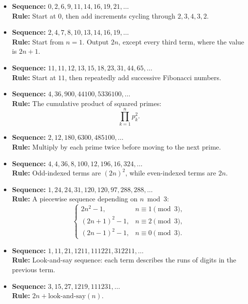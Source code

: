 \documentclass{article}
\theoremstyle{plain}
\theoremstyle{definition}
\theoremstyle{remark}
\begin{document}
\begin{itemize}
    \item \textbf{Sequence:} \(0, 2, 6, 9, 11, 14, 16, 19, 21, \dots\) \\
    \textbf{Rule:} Start at \(0\), then add increments cycling through \(2,3,4,3,2\).

    \item \textbf{Sequence:} \(2, 4, 7, 8, 10, 13, 14, 16, 19, \dots\) \\
    \textbf{Rule:} Start from \(n=1\). Output \(2n\), except every third term, where the value is \(2n+1\).

    \item \textbf{Sequence:} \(11, 11, 12, 13, 15, 18, 23, 31, 44, 65, \dots\) \\
    \textbf{Rule:} Start at \(11\), then repeatedly add successive Fibonacci numbers.

    \item \textbf{Sequence:} \(4, 36, 900, 44100, 5336100, \dots\) \\
    \textbf{Rule:} The cumulative product of squared primes:
    \[
    \prod_{k=1}^n p_k^2.
    \]

    \item \textbf{Sequence:} \(2, 12, 180, 6300, 485100, \dots\) \\
    \textbf{Rule:} Multiply by each prime twice before moving to the next prime.

    \item \textbf{Sequence:} \(4, 4, 36, 8, 100, 12, 196, 16, 324, \dots\) \\
    \textbf{Rule:} Odd-indexed terms are \((2n)^2\), while even-indexed terms are \(2n\).

    \item \textbf{Sequence:} \(1, 24, 24, 31, 120, 120, 97, 288, 288, \dots\) \\
    \textbf{Rule:} A piecewise sequence depending on \(n \bmod 3\):
    \[
    \begin{cases}
    2n^2 - 1, & n \equiv 1 \pmod 3,\\
    (2n+1)^2 - 1, & n \equiv 2 \pmod 3,\\
    (2n-1)^2 - 1, & n \equiv 0 \pmod 3.
    \end{cases}
    \]

    \item \textbf{Sequence:} \(1, 11, 21, 1211, 111221, 312211, \dots\) \\
    \textbf{Rule:} Look-and-say sequence: each term describes the runs of digits in the previous term.

    \item \textbf{Sequence:} \(3, 15, 27, 1219, 111231, \dots\) \\
    \textbf{Rule:} \(2n + \text{look-and-say}(n)\).
\end{itemize}
\end{document}
